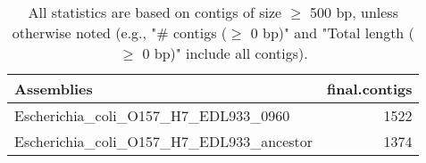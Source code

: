 \documentclass[12pt,a4paper]{article}
\begin{document}
\begin{table}[ht]
\begin{center}
\caption{All statistics are based on contigs of size $\geq$ 500 bp, unless otherwise noted (e.g., "\# contigs ($\geq$ 0 bp)" and "Total length ($\geq$ 0 bp)" include all contigs).}
\begin{tabular}{|l*{1}{|r}|}
\hline
Assemblies & final.contigs \\ \hline
Escherichia\_coli\_O157\_H7\_EDL933\_0960 & 1522 \\ \hline
Escherichia\_coli\_O157\_H7\_EDL933\_ancestor & 1374 \\ \hline
\end{tabular}
\end{center}
\end{table}
\end{document}
